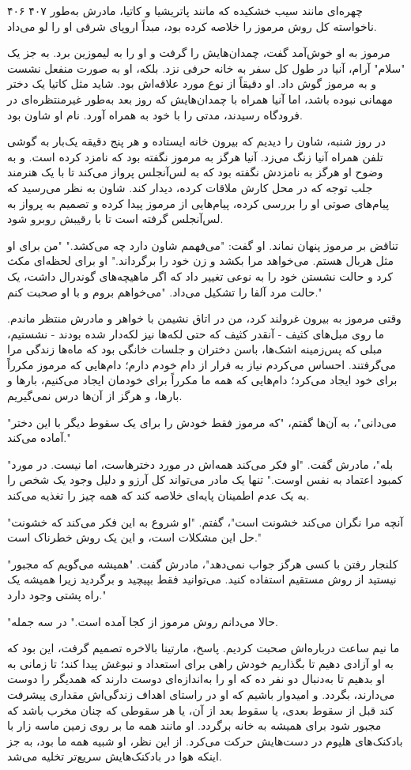 ۴۰۶ ۴۰۷  
چهره‌ای مانند سیب خشکیده که مانند پاتریشیا و کاتیا، مادرش به‌طور ناخواسته کل روش مرموز را خلاصه کرده بود، مبداً اروپای شرقی او را لو می‌داد.

مرموز به او خوش‌آمد گفت، چمدان‌هایش را گرفت و او را به لیموزین برد. به جز یک "سلام" آرام، آنیا در طول کل سفر به خانه حرفی نزد. بلکه، او به صورت منفعل نشست و به مرموز گوش داد. او دقیقاً از نوع مورد علاقه‌اش بود. شاید مثل کاتیا یک دختر مهمانی نبوده باشد، اما آنیا همراه با چمدان‌هایش که روز بعد به‌طور غیرمنتظره‌ای در فرودگاه رسیدند، مدتی را با خود به همراه آورد. نام او شاون بود.

در روز شنبه، شاون را دیدیم که بیرون خانه ایستاده و هر پنج دقیقه یک‌بار به گوشی تلفن همراه آنیا زنگ می‌زد. آنیا هرگز به مرموز نگفته بود که نامزد کرده است. و به‌ وضوح او هرگز به نامزدش نگفته بود که به لس‌آنجلس پرواز می‌کند تا با یک هنرمند جلب توجه که در محل کارش ملاقات کرده، دیدار کند. شاون به نظر می‌رسید که پیام‌های صوتی او را بررسی کرده، پیام‌هایی از مرموز پیدا کرده و تصمیم به پرواز به لس‌آنجلس گرفته است تا با رقیبش روبرو شود.

تناقض بر مرموز پنهان نماند. او گفت: "می‌فهمم شاون دارد چه می‌کشد." "من برای او مثل هربال هستم. می‌خواهد مرا بکشد و زن خود را برگرداند." او برای لحظه‌ای مکث کرد و حالت نشستن خود را به نوعی تغییر داد که اگر ماهیچه‌های گوندرال داشت، یک حالت مرد آلفا را تشکیل می‌داد. "می‌خواهم بروم و با او صحبت کنم."

وقتی مرموز به بیرون غرولند کرد، من در اتاق نشیمن با خواهر و مادرش منتظر ماندم. ما روی مبل‌های کثیف - آنقدر کثیف که حتی لکه‌ها نیز لکه‌دار شده بودند - نشستیم، مبلی که پس‌زمینه اشک‌ها، باسن دختران و جلسات خانگی بود که ماه‌ها زندگی مرا می‌گرفتند. احساس می‌کردم نیاز به فرار از دام خودم دارم؛ دام‌هایی که مرموز مکرراً برای خود ایجاد می‌کرد؛ دام‌هایی که همه ما مکرراً برای خودمان ایجاد می‌کنیم، بارها و بارها، و هرگز از آن‌ها درس نمی‌گیریم.

"می‌دانی"، به آن‌ها گفتم، "که مرموز فقط خودش را برای یک سقوط دیگر با این دختر آماده می‌کند."

"بله"، مادرش گفت. "او فکر می‌کند همه‌اش در مورد دخترهاست، اما نیست. در مورد کمبود اعتماد به نفس اوست." تنها یک مادر می‌تواند کل آرزو و دلیل وجود یک شخص را به یک عدم اطمینان پایه‌ای خلاصه کند که همه چیز را تغذیه می‌کند.

"آنچه مرا نگران می‌کند خشونت است"، گفتم. "او شروع به این فکر می‌کند که خشونت حل این مشکلات است، و این یک روش خطرناک است."

"کلنجار رفتن با کسی هرگز جواب نمی‌دهد"، مادرش گفت. "همیشه می‌گویم که مجبور نیستید از روش مستقیم استفاده کنید. می‌توانید فقط بپیچید و برگردید زیرا همیشه یک راه پشتی وجود دارد."

"حالا می‌دانم روش مرموز از کجا آمده است." در سه جمله.

ما نیم ساعت درباره‌اش صحبت کردیم. پاسخ، مارتینا بالاخره تصمیم گرفت، این بود که به او آزادی دهیم تا بگذاریم خودش راهی برای استعداد و نبوغش پیدا کند؛ تا زمانی به او بدهیم تا به‌دنبال دو نفر ده که او را به‌اندازه‌ای دوست دارند که همدیگر را دوست می‌دارند، بگردد. و امیدوار باشیم که او در راستای اهداف زندگی‌اش مقداری پیشرفت کند قبل از سقوط بعدی، یا سقوط بعد از آن، یا هر سقوطی که چنان مخرب باشد که مجبور شود برای همیشه به خانه برگردد. او مانند همه ما بر روی زمین ماسه زار با بادکنک‌های هلیوم در دست‌هایش حرکت می‌کرد. از این نظر، او شبیه همه ما بود، به جز اینکه هوا در بادکنک‌هایش سریع‌تر تخلیه می‌شد.